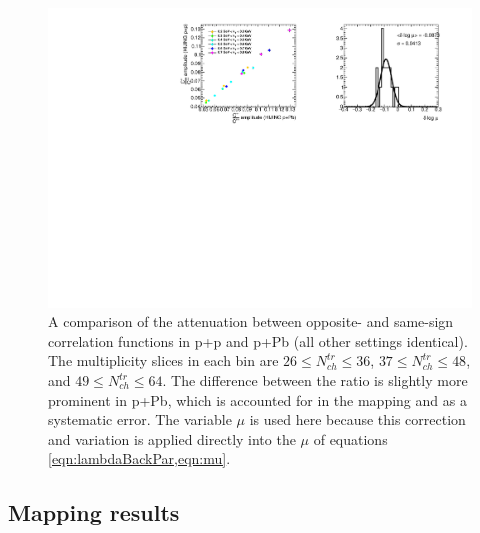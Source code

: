 \begin{figure}[t]
\begin{minipage}[t]{1.0\textwidth}
\centering
\includegraphics{mu_hijing_pp_pPb.pdf}
\end{minipage}
\caption{A comparison of the attenuation between opposite- and same-sign correlation functions in \Hijing p+p and \Hijing p+Pb (all other settings identical). The multiplicity slices in each \kt bin are $26 \leq N_{ch}^{tr} \leq 36$, $37 \leq N_{ch}^{tr} \leq 48$, and $49 \leq N_{ch}^{tr} \leq 64$. The difference between the ratio is slightly more prominent in p+Pb, which is accounted for in the mapping and as a systematic error. The variable $\mu$ is used here because this correction and variation is applied directly into the $\mu$ of equations \cref{eqn:lambdaBackPar,eqn:mu}.}
\label{fig:mu_hijing_pp_pPb}
\end{figure}

\FloatBarrier

\subsection{Mapping results}

